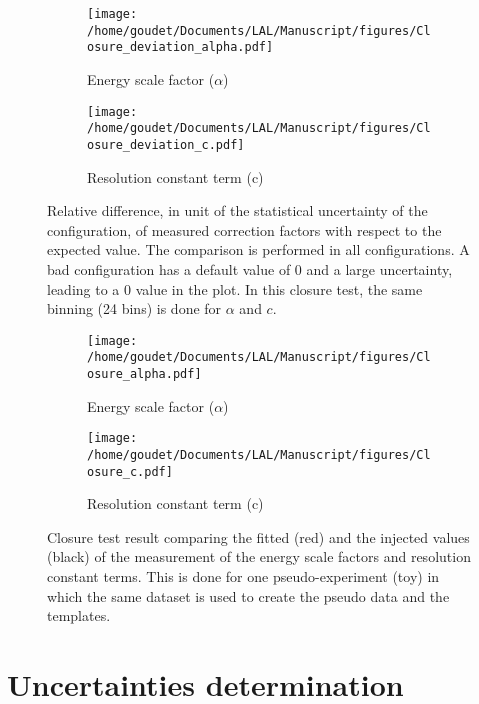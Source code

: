 \begin{figure}
\begin{subfigure}[t]{0.49\linewidth}
\begin{center}
\texttt{[image: /home/goudet/Documents/LAL/Manuscript/figures/Closure\_deviation\_alpha.pdf]}
\end{center}
\caption{Energy scale factor (\(\alpha\))}
\end{subfigure}
\begin{subfigure}[t]{0.49\linewidth}
\begin{center}
\texttt{[image: /home/goudet/Documents/LAL/Manuscript/figures/Closure\_deviation\_c.pdf]}
\end{center}
\caption{Resolution constant term (c)}
\end{subfigure}
\caption{\label{orge48e2b5}
  Relative difference, in unit of the statistical uncertainty of the configuration, of measured correction factors with respect to the expected value.
  The comparison is performed in all configurations. A bad configuration has a default value of 0 and a large uncertainty, leading to a 0 value in the plot.
  In this closure test, the same binning (24 bins) is done for $\alpha$ and $c$.
}
\end{figure}


\begin{figure}
\begin{subfigure}[t]{0.49\linewidth}
\begin{center}
\texttt{[image: /home/goudet/Documents/LAL/Manuscript/figures/Closure\_alpha.pdf]}
\end{center}
\caption{Energy scale factor (\(\alpha\))}
\end{subfigure}
\begin{subfigure}[t]{0.49\linewidth}
\begin{center}
\texttt{[image: /home/goudet/Documents/LAL/Manuscript/figures/Closure\_c.pdf]}
\end{center}
\caption{Resolution constant term (c)}
\end{subfigure}
\caption{\label{org3e85744}
Closure test result comparing the fitted (red) and the injected values (black) of the measurement of the energy scale factors and resolution constant terms. This is done for one pseudo-experiment (toy) in which the same dataset is used to create the pseudo data and the templates.}
\end{figure}


\section{Uncertainties determination}
\label{sec:org2bc2b1f}
\label{sec:Calibration_inSituUncertainties}

